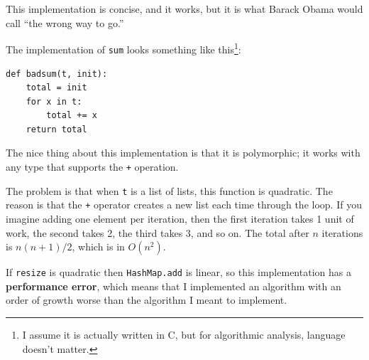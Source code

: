\documentclass[10pt]{book}
\begin{document}
This implementation is concise, and it works, but it is what
Barack Obama would call ``the wrong way to go.''

The implementation of {\tt sum} looks something like this\footnote{I
  assume it is actually written in C, but for algorithmic analysis,
  language doesn't matter.}:

\begin{verbatim}
def badsum(t, init):
    total = init
    for x in t:
        total += x
    return total
\end{verbatim}

The nice thing about this implementation is that it is polymorphic;
it works with any type that supports the {\tt +} operation.

The problem is that when {\tt t} is a list of lists, this function is
quadratic.  The reason is that the {\tt +} operator creates a new list
each time through the loop.  If you imagine adding one element per
iteration, then the first iteration takes 1 unit of work, the second
takes 2, the third takes 3, and so on.  The total after $n$ iterations
is $n (n+1) / 2$, which is in $O(n^2)$.

If {\tt resize} is quadratic then {\tt HashMap.add} is linear, so this
implementation has a {\bf performance error}, which means that I
implemented an algorithm with an order of growth worse than the
algorithm I meant to implement.
\end{document}
